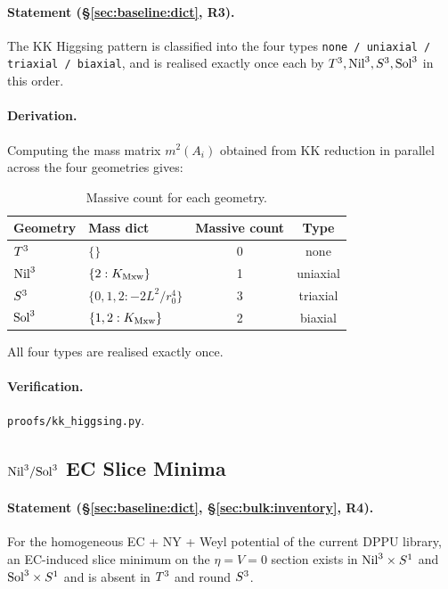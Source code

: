\paragraph{Statement (\S\ref{sec:baseline:dict}, R3).}
The KK Higgsing pattern is classified into the four types
\texttt{none / uniaxial / triaxial / biaxial}, and is realised exactly once
each by $T^3, \mathrm{Nil}^3, S^3, \mathrm{Sol}^3$ in this order.

\paragraph{Derivation.}
Computing the mass matrix $m^2(A_i)$ obtained from KK reduction in parallel
across the four geometries gives:

\begin{table}[H]
\centering
\begin{tabular}{llcc}
\toprule
Geometry & Mass dict & Massive count & Type \\
\midrule
$T^3$ & $\{\}$ & 0 & none \\
$\mathrm{Nil}^3$ & $\{2: K_{\mathrm{Mxw}}\}$ & 1 & uniaxial \\
$S^3$ & $\{0,1,2: -2 L^2/r_0^4\}$ & 3 & triaxial \\
$\mathrm{Sol}^3$ & $\{1, 2: K_{\mathrm{Mxw}}\}$ & 2 & biaxial \\
\bottomrule
\end{tabular}
\caption{Massive count for each geometry.}
\label{tab:appE_higgsing}
\end{table}

All four types are realised exactly once.

\paragraph{Verification.}
\texttt{proofs/kk\_higgsing.py}.

\subsection{$\mathrm{Nil}^3 / \mathrm{Sol}^3$ EC Slice Minima}
\label{app:E:E5b}

\paragraph{Statement (\S\ref{sec:baseline:dict}, \S\ref{sec:bulk:inventory}, R4).}
For the homogeneous EC + NY + Weyl potential of the current DPPU library, an
EC-induced slice minimum on the $\eta = V = 0$ section exists in
$\mathrm{Nil}^3\times S^1$ and $\mathrm{Sol}^3\times S^1$ and is absent in
$T^3$ and round $S^3$.

